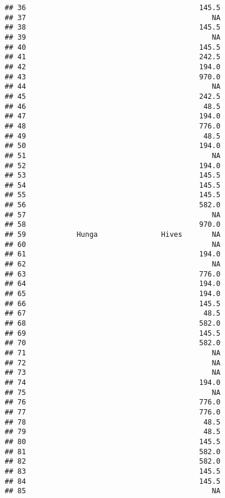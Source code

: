 \documentclass[
]{article}
\begin{document}
\begin{verbatim}
## 36                                         145.5
## 37                                            NA
## 38                                         145.5
## 39                                            NA
## 40                                         145.5
## 41                                         242.5
## 42                                         194.0
## 43                                         970.0
## 44                                            NA
## 45                                         242.5
## 46                                          48.5
## 47                                         194.0
## 48                                         776.0
## 49                                          48.5
## 50                                         194.0
## 51                                            NA
## 52                                         194.0
## 53                                         145.5
## 54                                         145.5
## 55                                         145.5
## 56                                         582.0
## 57                                            NA
## 58                                         970.0
## 59            Hunga               Hives       NA
## 60                                            NA
## 61                                         194.0
## 62                                            NA
## 63                                         776.0
## 64                                         194.0
## 65                                         194.0
## 66                                         145.5
## 67                                          48.5
## 68                                         582.0
## 69                                         145.5
## 70                                         582.0
## 71                                            NA
## 72                                            NA
## 73                                            NA
## 74                                         194.0
## 75                                            NA
## 76                                         776.0
## 77                                         776.0
## 78                                          48.5
## 79                                          48.5
## 80                                         145.5
## 81                                         582.0
## 82                                         582.0
## 83                                         145.5
## 84                                         145.5
## 85                                            NA

\end{verbatim}
\end{document}

